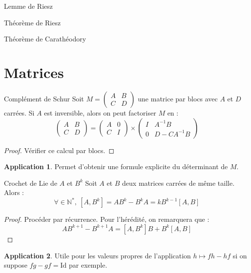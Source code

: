 \documentclass[french]{article}
\newcommand{\N}{\mathbb{N}}
\newcommand{\st}{^*}
\newcommand{\inv}{^{-1}}
\theoremstyle{theorem}
\theoremstyle{definition}
\newtheorem*{app}{Application}
\begin{document}
\begin{lem}{Lemme de Riesz}
	
\end{lem}

\begin{lem}{Théorème de Riesz}
	
\end{lem}

\begin{lem}{Théorème de Carathéodory}
	
\end{lem}

\section{Matrices}

\begin{lem}{Complément de Schur}
	Soit $M=\displaystyle\begin{pmatrix}
		A&B\\ C&D
	\end{pmatrix}$ une matrice par blocs avec $A$ et $D$ carrées. Si $A$ est inversible, alors on peut factoriser $M$ en : $$\begin{pmatrix}
	A&B\\ C&D
	\end{pmatrix}=\begin{pmatrix}
	A&0\\
	C&I
	\end{pmatrix}\times\begin{pmatrix}
	I&A\inv B\\
	0&D-CA\inv B
	\end{pmatrix}$$
\end{lem}
\begin{proof}
	Vérifier ce calcul par blocs.
\end{proof}
\begin{app}
	Permet d'obtenir une formule explicite du déterminant de $M$.
\end{app}

\begin{lem}{Crochet de Lie de $A$ et $B^k$}
	Soit $A$ et $B$ deux matrices carrées de même taille. Alors : $$\forall \in\N\st,\ [A,B^k]=AB^k-B^kA=kB^{k-1}[A,B]$$
\end{lem}
\begin{proof}
	Procéder par récurrence. Pour l'hérédité, on remarquera que : $$AB^{k+1}-B^{k+1}A=[A,B^k]B+B^k[A,B]$$
\end{proof}
\begin{app}
	Utile pour les valeurs propres de l'application $h\mapsto fh-hf$ si on suppose $fg-gf=\text{Id}$ par exemple. 
\end{app}
\end{document}

